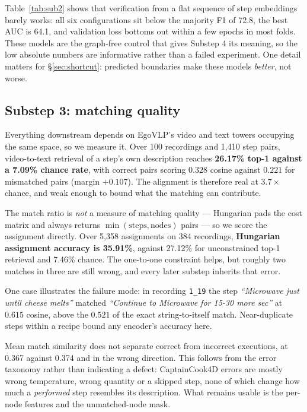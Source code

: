 \documentclass[10pt,twocolumn,letterpaper]{article}
\begin{document}
Table~\ref{tab:sub2} shows that verification from a flat sequence of step
embeddings barely works: all six configurations sit below the majority F1 of 72.8,
the best AUC is 64.1, and validation loss bottoms out within a few epochs in most
folds. These models are the graph-free control that gives Substep 4 its meaning, so
the low absolute numbers are informative rather than a failed experiment. One detail
matters for \S\ref{sec:shortcut}: predicted boundaries make these models
\emph{better}, not worse.

\subsection{Substep 3: matching quality}
\label{sec:matching}

Everything downstream depends on EgoVLP's video and text towers occupying the same
space, so we measure it. Over 100 recordings and 1{,}410 step pairs, video-to-text
retrieval of a step's own description reaches \textbf{26.17\% top-1 against a
7.09\% chance rate}, with correct pairs scoring $0.328$ cosine against $0.221$ for
mismatched pairs (margin $+0.107$). The alignment is therefore real at
$3.7\times$ chance, and weak enough to bound what the matching can contribute.

The match ratio is \emph{not} a measure of matching quality --- Hungarian pads the
cost matrix and always returns $\min(\text{steps}, \text{nodes})$ pairs --- so we
score the assignment directly. Over 5{,}358 assignments on 384 recordings,
\textbf{Hungarian assignment accuracy is 35.91\%}, against 27.12\% for
unconstrained top-1 retrieval and 7.46\% chance. The one-to-one constraint helps,
but roughly two matches in three are still wrong, and every later substep inherits
that error.

One case illustrates the failure mode: in recording \texttt{1\_19} the step
\emph{``Microwave just until cheese melts''} matched \emph{``Continue to Microwave
for 15-30 more sec''} at $0.615$ cosine, above the $0.521$ of the exact
string-to-itself match. Near-duplicate steps within a recipe bound any encoder's
accuracy here.

Mean match similarity does not separate correct from incorrect executions, at 0.367
against 0.374 and in the wrong direction. This follows from the error taxonomy
rather than indicating a defect: CaptainCook4D errors are mostly wrong temperature,
wrong quantity or a skipped step, none of which change how much a \emph{performed}
step resembles its description. What remains usable is the per-node features and the
unmatched-node mask.
\end{document}
